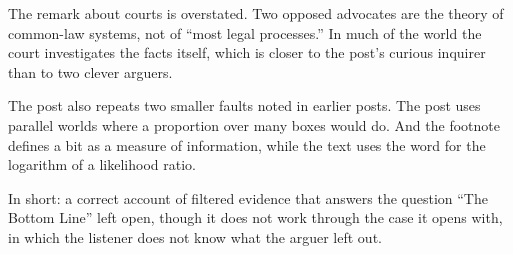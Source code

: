 \begin{afterword}
The remark about courts is overstated. Two opposed advocates are the theory of common-law systems, not of ``most legal processes.'' In much of the world the court investigates the facts itself, which is closer to the post's curious inquirer than to two clever arguers.

The post also repeats two smaller faults noted in earlier posts. The post uses parallel worlds where a proportion over many boxes would do. And the footnote defines a bit as a measure of information, while the text uses the word for the logarithm of a likelihood ratio.

In short: a correct account of filtered evidence that answers the question ``The Bottom Line'' left open, though it does not work through the case it opens with, in which the listener does not know what the arguer left out.
\end{afterword}
